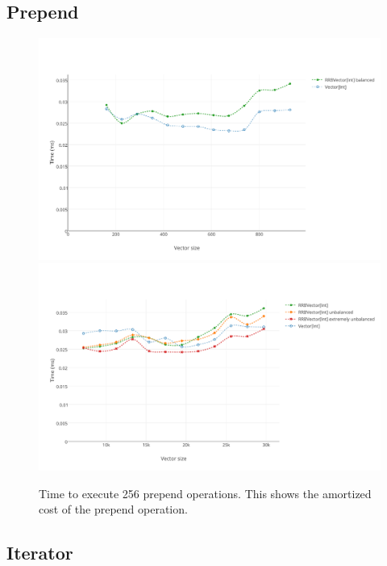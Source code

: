 \subsection{Prepend}

\begin{figure}[h!]
  \centering
  \includegraphics[width=\textwidth]{Benchmarks/Prepend_2.pdf}
  \includegraphics[width=\textwidth]{Benchmarks/Prepend_3.pdf}
  \label{PrependBenchmarks}
  \caption{Time to execute 256 prepend operations. This shows the amortized cost of the prepend operation.}
\end{figure}

\subsection{Iterator}

